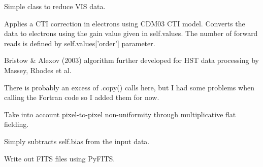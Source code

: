\documentclass[a4paper,11pt,english]{sphinxmanual}
\begin{document}
\begin{fulllineitems}
\label{reduction:reduction.reduceVISdata.reduceVISdata}
Simple class to reduce VIS data.

\begin{fulllineitems}
\label{reduction:reduction.reduceVISdata.reduceVISdata.applyCTICorrection}
Applies a CTI correction in electrons using CDM03 CTI model.
Converts the data to electrons using the gain value given in self.values.
The number of forward reads is defined by self.values{[}'order'{]} parameter.

Bristow \& Alexov (2003) algorithm further developed for HST data
processing by Massey, Rhodes et al.

There is probably an excess of .copy() calls here, but I had some problems
when calling the Fortran code so I added them for now.

\end{fulllineitems}


\begin{fulllineitems}
\label{reduction:reduction.reduceVISdata.reduceVISdata.flatfield}
Take into account pixel-to-pixel non-uniformity through multiplicative flat fielding.

\end{fulllineitems}


\begin{fulllineitems}
\label{reduction:reduction.reduceVISdata.reduceVISdata.subtractBias}
Simply subtracts self.bias from the input data.

\end{fulllineitems}


\begin{fulllineitems}
\label{reduction:reduction.reduceVISdata.reduceVISdata.writeFITSfile}
Write out FITS files using PyFITS.

\end{fulllineitems}


\end{fulllineitems}
\end{document}
